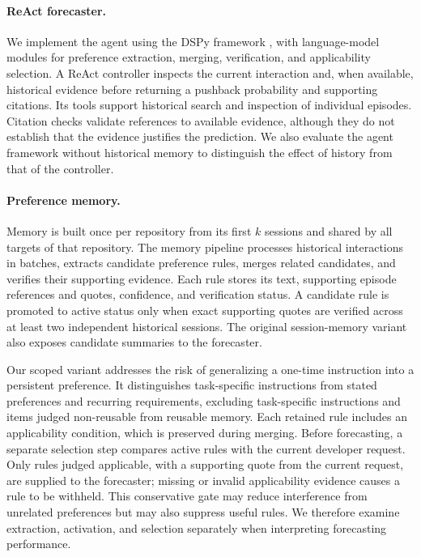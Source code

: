 \documentclass{article} %
\begin{document}
\paragraph{ReAct forecaster.}
We implement the agent using the DSPy framework \citep{khattab2023dspy}, with language-model modules for preference extraction, merging, verification, and applicability selection. A ReAct controller \citep{yao2023react} inspects the current interaction and, when available, historical evidence before returning a pushback probability and supporting citations. Its tools support historical search and inspection of individual episodes. Citation checks validate references to available evidence, although they do not establish that the evidence justifies the prediction. We also evaluate the agent framework without historical memory to distinguish the effect of history from that of the controller.

\paragraph{Preference memory.}
Memory is built once per repository from its first $k$ sessions and shared by all targets of that repository. The memory pipeline processes historical interactions in batches, extracts candidate preference rules, merges related candidates, and verifies their supporting evidence. Each rule stores its text, supporting episode references and quotes, confidence, and verification status. A candidate rule is promoted to active status only when exact supporting quotes are verified across at least two independent historical sessions. The original session-memory variant also exposes candidate summaries to the forecaster.

Our scoped variant addresses the risk of generalizing a one-time instruction into a persistent preference. It distinguishes task-specific instructions from stated preferences and recurring requirements, excluding task-specific instructions and items judged non-reusable from reusable memory. Each retained rule includes an applicability condition, which is preserved during merging. Before forecasting, a separate selection step compares active rules with the current developer request. Only rules judged applicable, with a supporting quote from the current request, are supplied to the forecaster; missing or invalid applicability evidence causes a rule to be withheld. This conservative gate may reduce interference from unrelated preferences but may also suppress useful rules. We therefore examine extraction, activation, and selection separately when interpreting forecasting performance.
\end{document}
